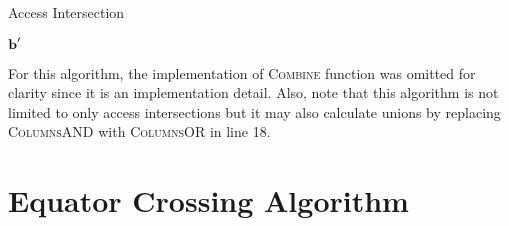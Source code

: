 \begin{algorithm}[h] 
    \caption{Access Intersection} 
    \label{alg:access-intersection}
    \begin{algorithmic}[1]




	     

	     

		 
		
		\Else
		\EndIf


	    \EndWhile 


	     

	\State \Return $\bm{\mathrm{b}}'$
	\EndFunction
    \end{algorithmic}


\end{algorithm}

For this algorithm, the implementation of \textsc{Combine} function was omitted
for clarity since it is an implementation detail. Also, note that this
algorithm is not limited to only access intersections but it may also calculate
unions by replacing \textsc{ColumnsAND} with \textsc{ColumnsOR} in line 18.


\section{Equator Crossing Algorithm} \label{sec:equator-crossing}

